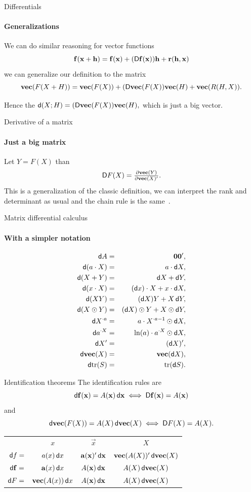 \documentclass[noamsthm]{beamer}
\begin{document}
\begin{frame}{Differentials}
\framesubtitle{Generalizations}
We can do similar reasoning for vector functions
\[\mathbf{f}(\mathbf{x} + \mathbf{h}) = \mathbf{f}(\mathbf{x}) + (\mathop{}\!\mathsf D\mathbf{f}(\mathbf{x}))\mathbf{h} + \mathbf{r}(\mathbf{h},\mathbf{x})\]
we can generalize our definition to the matrix
\[\mathbf{vec}(F(X+H)) = \mathbf{vec}(F(X)) + (\mathop{}\!\mathsf D\mathbf{vec}(F(X))\mathbf{vec}(H) + \mathbf{vec}(R(H,X)).\]

Hence the \(\mathop{}\!\mathsf d(X;H)=(\mathop{}\!\mathsf D\mathbf{vec}(F(X))\mathbf{vec}(H),\) which is just a big vector.
\end{frame}

\begin{frame}{Derivative of a matrix}
\framesubtitle{Just a big matrix}
Let \(Y=F(X)\) than
\[\mathop{}\!\mathsf D F(X) = \textstyle\frac{\partial\mathbf{vec}(Y)}{\partial\mathbf{vec}(X)'}.\]
This is a generalization of the classic definition, we can interpret the rank
and determinant as usual and the chain rule is the same~\cite{magnus2007}.
\end{frame}


\begin{frame}{Matrix differential calculus}
\framesubtitle{With a simpler notation}
\begin{eqnarray*}
\dif A            &=& \vec 0 \vec 0', \\
\dif (a \cdot X)  &=& a \cdot \dif X, \\
\dif (X + Y)      &=& \dif X + \dif Y, \\
\dif (x \cdot X)  &=& (\dif x) \cdot X + x \cdot \dif X, \\
\dif (XY)         &=& (\dif X)Y + X \dif Y, \\
\dif (X \hadam Y) &=& (\dif X) \hadam Y + X \hadam \dif Y, \\
\dif X^{{\cdot}a} &=& a \cdot X^{{\cdot}a-1} \hadam \dif X, \\
\dif a^{{\cdot}X} &=& \ln(a) \cdot a^{{\cdot}X} \hadam \dif X, \\
\dif X'           &=& (\dif X)', \\
\dif\vect(X)      &=& \vect(\dif X), \\
\dif\trace(S)     &=& \trace(\dif S).
\end{eqnarray*}
\end{frame}

\begin{frame}{Identification theorems}
The identification rules are \[\mathop{}\!\mathsf d\mathbf{f}(\mathbf{x}) = A(\mathbf{x})
\mathop{}\!\mathsf d\mathbf{x} \iff \mathop{}\!\mathsf D \mathbf{f}(\mathbf{x}) = A(\mathbf{x})\] and \[\mathop{}\!\mathsf d \mathbf{vec}(F(X)) = A(X)
\mathop{}\!\mathsf d\mathbf{vec}(X) \iff \mathop{}\!\mathsf D F(X) = A(X).\]
\begin{tabular}{cccc}
 & \(x\) & \(\vec x\) & \(X\) \\[2pt]
         \cline{2-4}
\multicolumn{1}{r|}{\(\mathop{}\!\mathsf d f =\)}
    & \(a(x) \mathop{}\!\mathsf d x\) & \(\mathbf{a}(\mathbf{x})' \mathop{}\!\mathsf d\mathbf{x}\) & \(\mathbf{vec}(A(X))' \mathop{}\!\mathsf d\mathbf{vec}(X)\) \\
\multicolumn{1}{r|}{\(\mathop{}\!\mathsf d\mathbf{f} =\)}
    & \(\mathbf{a}(x) \mathop{}\!\mathsf d x\) & \(A(\mathbf{x}) \mathop{}\!\mathsf d\mathbf{x}\) & \(A(X) \mathop{}\!\mathsf d\mathbf{vec}(X)\) \\
\multicolumn{1}{r|}{\(\mathop{}\!\mathsf d F =\)}
    & \(\mathbf{vec}(A(x)) \mathop{}\!\mathsf d x\) & \(A(\mathbf{x}) \mathop{}\!\mathsf d\mathbf{x}\) & \(A(X) \mathop{}\!\mathsf d\mathbf{vec}(X)\)
\end{tabular}
\end{frame}
\end{document}
